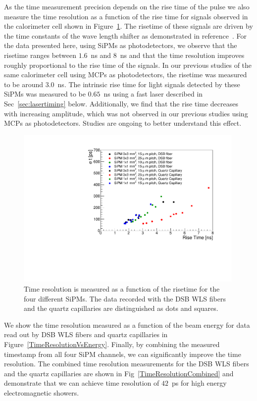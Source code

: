 As the time measurement precision depends on the rise time of the pulse we also
measure the time resolution as a function of the rise time for signals observed
in the calorimeter cell shown in Figure~\ref{RiseTime}. The risetime of these
signals are driven by the time constants of the wave length shifter as
demonstrated in reference~\cite{Anderson:2015gha}. For the data presented here,
using SiPMs as photodetectors, we observe that the risetime ranges between
$1.6$~ns and $8$~ns and that the time resolution improves roughly proportional
to the rise time of the signals. In our previous studies of the same calorimeter 
cell using MCPs as photodetectors\cite{Anderson:2015gha}, the risetime was measured to be around 
$3.0$~ns. The intrinsic rise time for light signals detected by these SiPMs was
measured to be $0.65$~ns using a fast laser described in Sec~\ref{sec:lasertiming} below. 
Additionally, we find that the rise time decreases with increasing amplitude, which was
not observed in our previous studies using MCPs as photodetectors. 
Studies are ongoing to better understand this effect.

\begin{figure}[htb]
\centering
\includegraphics[width=0.99\textwidth]{figures/ShashlikTimeResolutionVsRiseTime.pdf}
\caption{\label{RiseTime}Time resolution is measured as a function of the risetime
for the four different SiPMs. The data recorded with the DSB WLS fibers and the
quartz capillaries are distinguished as dots and squares. }
\end{figure}

We show the time resolution measured as a function of the beam energy for
data read out by DSB WLS fibers and quartz capillaries in 
Figure~\ref{TimeResolutionVsEnergy}. Finally, by combining the measured timestamp
from all four SiPM channels, we can significantly improve the time resolution.
The combined time resolution measurements for the DSB WLS fibers and the quartz capillaries 
are shown in Fig~\ref{TimeResolutionCombined} and demonstrate that we can achieve time resolution
of $42$~ps for high energy electromagnetic showers.


